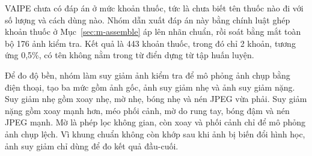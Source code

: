 VAIPE chưa có đáp án ở mức khoản thuốc, tức là chưa biết tên thuốc nào đi với số lượng và cách dùng nào.
Nhóm dẫn xuất đáp án này bằng chính luật ghép khoản thuốc ở Mục~\ref{sec:m-assemble} áp lên nhãn chuẩn, rồi soát bằng mắt toàn bộ 176 ảnh kiểm tra.
Kết quả là 443 khoản thuốc, trong đó chỉ 2 khoản, tương ứng 0,5\%, có tên không nằm trong từ điển dựng từ tập huấn luyện.

Để đo độ bền, nhóm làm suy giảm ảnh kiểm tra để mô phỏng ảnh chụp bằng điện thoại, tạo ba mức gồm ảnh gốc, ảnh suy giảm nhẹ và ảnh suy giảm nặng.
Suy giảm nhẹ gồm xoay nhẹ, mờ nhẹ, bóng nhẹ và nén JPEG vừa phải.
Suy giảm nặng gồm xoay mạnh hơn, méo phối cảnh, mờ do rung tay, bóng đậm và nén JPEG mạnh.
Mờ là phép lọc không gian, còn xoay và phối cảnh chỉ để mô phỏng ảnh chụp lệch.
Vì khung chuẩn không còn khớp sau khi ảnh bị biến đổi hình học, ảnh suy giảm chỉ dùng để đo kết quả đầu-cuối.
